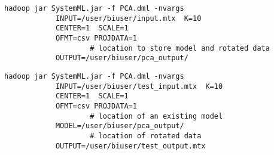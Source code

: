 
\begin{verbatim}
hadoop jar SystemML.jar -f PCA.dml -nvargs 
            INPUT=/user/biuser/input.mtx  K=10
            CENTER=1  SCALE=1
            OFMT=csv PROJDATA=1
				    # location to store model and rotated data
            OUTPUT=/user/biuser/pca_output/   
\end{verbatim}

\begin{verbatim}
hadoop jar SystemML.jar -f PCA.dml -nvargs 
            INPUT=/user/biuser/test_input.mtx  K=10
            CENTER=1  SCALE=1
            OFMT=csv PROJDATA=1
				    # location of an existing model
            MODEL=/user/biuser/pca_output/       
				    # location of rotated data
            OUTPUT=/user/biuser/test_output.mtx  
\end{verbatim}



